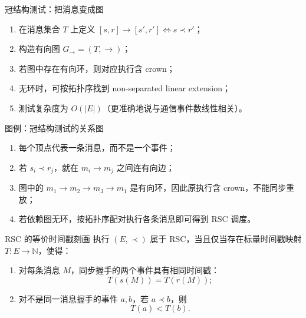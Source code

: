\documentclass[UTF8,fontset=none,aspectratio=169,10pt]{beamer}
\begin{document}
{\begin{frame}{冠结构测试：把消息变成图}
\begin{enumerate}
  \item 在消息集合 $T$ 上定义 $[s,r]\rightarrow[s',r']\iff s\prec r'$；
  \item 构造有向图 $G_{\rightarrow}=(T,\rightarrow)$；
  \item 若图中存在有向环，则对应执行含 crown；
  \item 无环时，可按拓扑序找到 non-separated linear extension；
  \item 测试复杂度为 $O(|E|)$（更准确地说与通信事件数线性相关）。
\end{enumerate}
\vfill
{}
\end{frame}

\begin{frame}{图例：冠结构测试的关系图}
\begin{center}
\end{center}
\begin{enumerate}
  \item 每个顶点代表一条消息，而不是一个事件；
  \item 若 $s_i\prec r_j$，就在 $m_i\rightarrow m_j$ 之间连有向边；
  \item 图中的 $m_1\rightarrow m_2\rightarrow m_3\rightarrow m_1$ 是有向环，因此原执行含 crown，不能同步重放；
  \item 若依赖图无环，按拓扑序配对执行各条消息即可得到 RSC 调度。
\end{enumerate}
\end{frame}

\begin{frame}{RSC 的等价时间戳刻画}
执行 $(E,\prec)$ 属于 RSC，当且仅当存在标量时间戳映射 $T:E\rightarrow\mathbb{N}$，使得：
\begin{enumerate}
  \item 对每条消息 $M$，同步握手的两个事件具有相同时间戳：
  \[
  T(s(M))=T(r(M));
  \]
  \item 对不是同一消息握手的事件 $a,b$，若 $a\prec b$，则
  \[
  T(a)<T(b).
  \]
\end{enumerate}
\vfill
{}
\end{frame}

}
\end{document}
